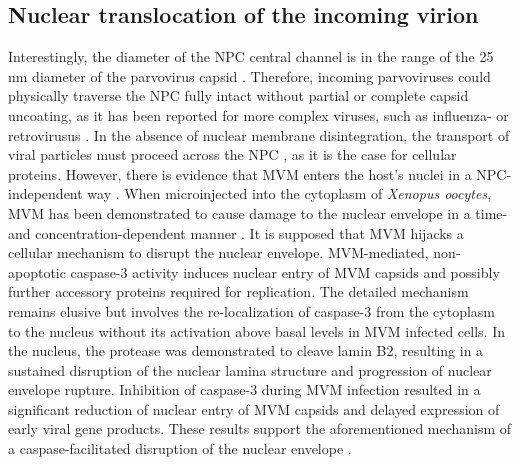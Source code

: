 \subsection{Nuclear translocation of the incoming virion}
Interestingly, the diameter of the NPC central channel \cite{pmid11854401, pmid2450095} is in the range of the 25 nm diameter of the parvovirus capsid \cite{NPC}. Therefore, incoming parvoviruses could physically traverse the NPC fully intact without partial or complete capsid uncoating, as it has been reported for more complex viruses, such as influenza- or retrovirusus \cite{pmid10848617, pmid11389849, pmid8970960, pmid11031249, pmid9891810}. In the absence of nuclear membrane disintegration, the transport of viral particles must proceed across the NPC \cite{pmid10801463, pmid10395558, pmid11448991}, as it is the case for cellular proteins. However, there is evidence that MVM enters the host's nuclei in a NPC-independent way \cite{pmid17030854}. When microinjected into the cytoplasm of \textit{Xenopus oocytes}, MVM has been demonstrated to cause damage to the nuclear envelope in a time- and concentration-dependent manner \cite{pmid16298969}. It is supposed that MVM hijacks a cellular mechanism to disrupt the nuclear envelope. MVM-mediated, non-apoptotic caspase-3 activity induces nuclear entry of MVM capsids and possibly further accessory proteins required for replication. The detailed mechanism remains elusive but involves the re-localization of caspase-3 from the cytoplasm to the nucleus without its activation above basal levels in MVM infected cells. In the nucleus, the protease was demonstrated to cleave lamin B2, resulting in a sustained disruption of the nuclear lamina structure and progression of nuclear envelope rupture. Inhibition of caspase-3 during MVM infection resulted in a significant reduction of nuclear entry of MVM capsids and delayed expression of early viral gene products. These results support the aforementioned mechanism of a caspase-facilitated disruption of the nuclear envelope \cite{pmid21367902}.  


